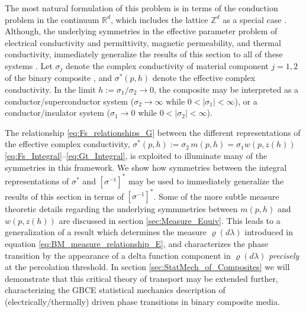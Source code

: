 \documentclass[english,12pt,jmp,graphicx]{revtex4-1}
\begin{document}
The most natural formulation of this problem is in terms of the
conduction problem in the continuum $\mathbb{R}^d$, which includes the
lattice $\mathbb{Z}^d$ as a special case
\cite{Golden:JMP-5627,Golden:CMP-473}. Although, the underlying
symmetries in the effective parameter problem of electrical
conductivity and permittivity, magnetic permeability, and thermal 
conductivity, immediately generalize the results of this section to
all of these systems \cite{MILTON:2002:TC}. Let $\sigma_j$ denote the
complex conductivity of material component $j=1,2$ of the binary
composite \cite{Efros:PSSB-303}, and $\sigma^*(p,h)$ denote the effective
complex conductivity. In the limit $h:=\sigma_1/\sigma_2\to0$, the composite may  
be interpreted as a conductor/superconductor system ($\sigma_2\to\infty$ while
$0<|\sigma_1|<\infty$), or a conductor/insulator system ($\sigma_1\to0$ while
$0<|\sigma_2|<\infty$). 

The relationship \eqref{eq:Fs_relationships_G} between the different 
representations of the effective complex conductivity,
$\sigma^*(p,h):=\sigma_2\,m(p,h)=\sigma_1w(p,z(h))$
\eqref{eq:Fs_Integral}--\eqref{eq:Gt_Integral}, is exploited to
illuminate many of the symmetries in this framework. We show how 
symmetries between the integral representations of $\sigma^*$ and
$[\sigma^{-1}]^*$ may be used to immediately generalize the results of
this section in terms of $[\sigma^{-1}]^*$. Some of the more subtle measure
theoretic details regarding the underlying symmmetries between
$m(p,h)$ and $w(p,z(h))$ are discussed in section
\ref{sec:Measure_Equiv}. This leads to a generalization of a result
\cite{Day:JPCM-96} which determines the measure $\varrho(d\lambda)$ introduced in
equation \eqref{eq:BM_measure_relationship_E}, and characterizes the
phase transition by the appearance of a delta function component in
$\varrho(d\lambda)$ \emph{precisely} at the percolation threshold. In section
\ref{sec:StatMech_of_Composites} we will demonstrate that this
critical theory of transport may be extended further, characterizing 
the GBCE statistical mechanics description of (electrically/thermally)
driven phase transitions in binary composite media.           
%
\end{document}
